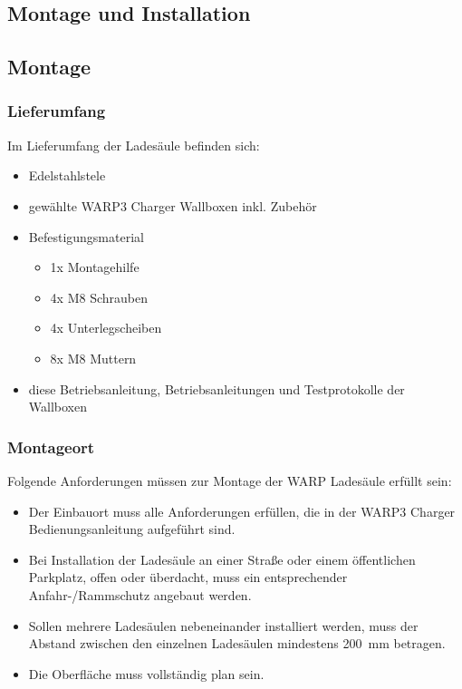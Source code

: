 \documentclass[a4paper,10pt]{article}
\begin{document}
\begin{multicols*}{2}
	\section{Montage und Installation}
	\subsection{Montage}
	\subsubsection{Lieferumfang}
	Im Lieferumfang der Ladesäule befinden sich:
	\begin{itemize}
		\item Edelstahlstele
		\item gewählte WARP3 Charger Wallboxen inkl. Zubehör
		\item Befestigungsmaterial
			\begin{itemize}
				\item 1x Montagehilfe
				\item 4x M8 Schrauben
				\item 4x Unterlegscheiben
				\item 8x M8 Muttern
			\end{itemize}
		\item diese Betriebsanleitung, Betriebsanleitungen und Testprotokolle der Wallboxen
	\end{itemize}
\vspace{-0.1cm}
	\subsubsection{Montageort}
	Folgende Anforderungen müssen zur Montage der WARP Ladesäule erfüllt sein:
	\begin{itemize}
		\item Der Einbauort muss alle Anforderungen erfüllen, die in der
		WARP3 Charger Bedienungsanleitung aufgeführt sind.
		\item Bei Installation der Ladesäule an einer Straße oder einem
		öffentlichen Parkplatz, offen oder überdacht, muss ein entsprechender
		Anfahr-/Rammschutz angebaut werden.
		\item Sollen mehrere Ladesäulen nebeneinander installiert werden, muss
		der Abstand zwischen den einzelnen Ladesäulen mindestens \SI{200}{\milli\meter} betragen.
		\item Die Oberfläche muss vollständig plan sein.
	\end{itemize}


\end{multicols*}
\end{document}
